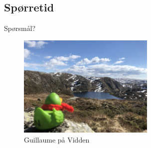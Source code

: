 \subsection*{Spørretid}
\begin{frame}{Spørsmål?}
    \begin{figure}
        \centering
        \includegraphics[height = 4.9cm]{images/guillaume4.jpg}
        \caption{Guillaume på Vidden}
        \label{fig:guillaume4}
    \end{figure}
\end{frame}